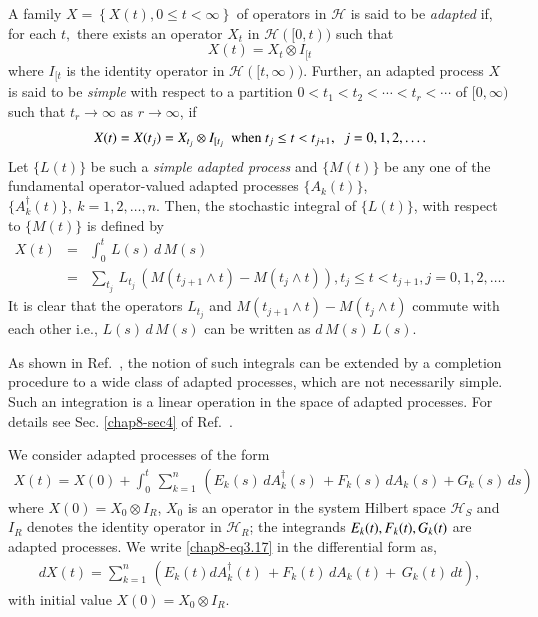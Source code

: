 A family $X = \left \{ X(t), 0 \leq t < \infty \right \}$ of operators in  $\mathcal{H}$ is said to be {\it adapted} if, for each $t,$ there exists an operator $X_t$ in $\mathcal{H}([0,t))$ such that 
$$
X(t) = X_t \otimes I_{[t}
$$ 
where $I_{[t}$ is the identity operator in $\mathcal{H}([t,\infty)).$  Further, an adapted process $X$ is said to be {\it simple} with respect to a partition $0 < t_1 < t_2 < \cdots < t_r < \cdots $ of $[0, \infty)$ such that $t_r \rightarrow \infty$ as $r \rightarrow \infty$, if 
\begin{equation}
X(t)=X({t_j})=X_{t_j} \otimes I_{[t_j} \ \  {\rm when}\ t_j\leq t<t_{j+1},\ \ j=0,1,2,\ldots .  \label{chap8-eq15}
\end{equation}
Let $\{L(t)\}$ be such a {\it simple adapted process} and $\{M(t)\}$ be any one of the fundamental operator-valued adapted processes $\{A_k(t)\}$, $\{A_k^\dag(t)\},\ k=1,2,\ldots, n$. Then,  the stochastic integral of   $\{L(t)\}$, with respect to  $\{M(t)\}$  is defined by  
\begin{eqnarray}
		X(t)&=&\int_{0}^t\,  L(s)\, d\, M(s)  \nonumber \\
		&=&\sum_{t_j}\, L_{t_j}\, \left( M (t_{j+1} \wedge t)- M (t_{j} \wedge t)\right), t_j\leq t<t_{j+1},  j=0,1,2,\ldots. \label{chap8-eq3.16} 
\end{eqnarray}
It is clear that the operators $L_{t_j}$ and  $M (t_{j+1} \wedge t)- M (t_{j} \wedge t)$ commute with each other i.e., $ L(s)\, d\, M(s)$ can be written as $d\, M(s)\, L(s).$ 

As shown in Ref.~\cite{chap8-key7}, the notion of such integrals can be extended by a completion procedure to a wide class of adapted processes, which are not necessarily simple. Such an integration is a linear operation in the space of adapted processes.  For details see Sec. \ref{chap8-sec4} of Ref.~\cite{chap8-key7}. 

We consider adapted processes of the form  
\begin{eqnarray}
		X(t)=X(0)+ \int_0^t\, \sum_{k=1}^n\, \left(E_{k}(s)\, dA^\dag_k(s)\, + F_{k}(s)\, dA_k(s)+ G_{k}(s)\, ds\right)  \label{chap8-eq3.17}
\end{eqnarray}    
where $X(0)=X_0\otimes I_R$,  $X_0$ is an operator in the system Hilbert space $\mathcal{H}_S$ and $I_R$ denotes the identity operator in $\mathcal{H}_R$; the integrands $E_k(t), F_k(t),\break G_k(t)$ are adapted processes. 
We write \eqref{chap8-eq3.17}  in the differential form as, 
\begin{eqnarray}
		dX(t)=\sum_{k=1}^n\, \left( E_{k}(t) dA^\dag_k(t)\, + F_{k}(t)\, dA_k(t)+\,  G_{k}(t)\, dt\right),  \label{chap8-eq3.18}
\end{eqnarray}    
with initial value $X(0)=X_0\otimes I_R$. 

